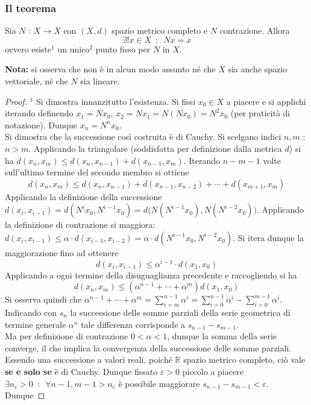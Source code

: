 \documentclass[10pt, oneside]{book}
\theoremstyle{plain}
\begin{document}
\subsubsection{Il teorema}
\begin{ther}
Sia $N$ : $X \rightarrow X$ con $(X,d)$ spazio metrico completo e $N$ contrazione. Allora
\[\exists! x \in X \enspace : \enspace N x = x\]
ovvero esiste$^1$ un unico$^2$ punto fisso per $N$ in $X$.
\end{ther}
\textbf{Nota:} si osserva che non è in alcun modo assunto né che $X$ sia anche spazio vettoriale, né che $N$ sia lineare.
\begin{proof}
$^1$ Si dimostra innanzitutto l'esistenza. Si fissi $x_0 \in X$ a piacere e si applichi iterando definendo $x_1 = N x_0$, $x_2 = N x_1 = N (N x_0) = N^2 x_0$ (per praticità di notazione). Dunque $x_n = N^n x_0$. 
\\Si dimostra che la successione così costruita è di Cauchy. Si scelgano indici $n,m$ : $n > m$. Applicando la triangolare (soddisfatta per definizione dalla metrica $d$) si ha $d(x_n, x_m) \leq d(x_n, x_{n-1}) + d(x_{n-1}, x_m)$. Iterando $n-m-1$ volte sull'ultimo termine del secondo membro si ottiene
\[d(x_n, x_m) \leq d(x_n, x_{n-1}) + d(x_{n-1}, x_{n-2}) + \cdots + d(x_{m+1}, x_m)\]
Applicando la definizione della successione $\displaystyle d(x_i, x_{i-1}) = d(N^i x_0, N^{i-1} x_0) = d\big( N (N^{i-1} x_0), N (N^{i-2} x_0)\big)$. Applicando la definizione di contrazione si maggiora: $\displaystyle d(x_i, x_{i-1}) \leq \alpha \cdot d(x_{i-1}, x_{i-2}) = \alpha \cdot d(N^{i-1} x_0, N^{i-2} x_0)$. Si itera dunque la maggiorazione fino ad ottenere 
\[d(x_i, x_{i-1}) \leq \alpha^{i-1} \cdot d(x_1, x_0)\]
Applicando a ogni termine della disuguaglianza precedente e raccogliendo si ha
\[d(x_n, x_m) \leq (\alpha^{n-1} + \cdots + \alpha^m) d(x_1, x_0)\]
Si osserva quindi che $\displaystyle \alpha^{n-1} + \cdots + \alpha^m = \sum\limits_{i=m}^{n-1} \alpha^i = \sum\limits_{i=0}^{n-1} \alpha^i - \sum\limits_{i=0}^{m-1} \alpha^i$. Indicando con $s_n$ la successione delle somme parziali della serie geometrica di termine generale $\alpha^n$ tale differenza corrisponde a $s_{n-1} - s_{m-1}$.
\\Ma per definizione di contrazione $0 < \alpha < 1$, dunque la somma della serie converge, il che implica la convergenza della successione delle somme parziali. Essendo una successione a valori reali, poiché $\mathbb{R}$ spazio metrico completo, ciò vale \textbf{se e solo se} è di Cauchy. Dunque fissato $\varepsilon > 0$ piccolo a piacere $\exists n_c > 0 \enspace : \enspace \forall n-1, m-1 > n_c$ è possibile maggiorare $s_{n-1} - s_{m-1} < \varepsilon$. Dunque 

\end{proof}
\end{document}
